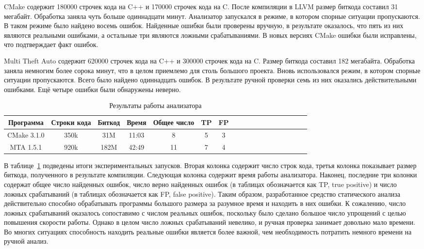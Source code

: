 CMake содержит 180000 строчек кода на C++ и 170000 строчек кода на
C. После компиляции в LLVM размер биткода составил 31
мегабайт. Обработка заняла чуть больше одиннадцати минут. Анализатор
запускался в режиме, в котором спорные ситуации пропускаются. В таком
режиме было найдено восемь ошибок. Найденные ошибки были проверены
вручную, в результате оказалось, что пять из них являются реальными
ошибками, а остальные три являются ложными срабатываниями. В новых
версиях CMake ошибки были исправлены, что подтверждает факт ошибок.

Multi Theft Auto содержит 620000 строчек кода на C++ и 300000 строчек
кода на C. Размер биткода составил 182 мегабайта. Обработка заняла
немногим более сорока минут, что в целом приемлемо для столь большого
проекта. Вновь использовался режим, в котором спорные ситуации
пропускаются. Всего было найдено одиннадцать ошибок. В результате
ручной проверки семь из них оказались действительными ошибками. Ещё
четыре ошибки были обнаружены неверно.

\begin{table}[!h]
\caption{Результаты работы анализатора}\label{tab:analyzer-results}
\centering
  \begin{tabular}{|*{18}{c|}}\hline
  Программа   & Строки кода & Биткод & Время & Общее число & TP & FP \\\hline
  CMake 3.1.0 & 350k        & 31M    & 11:03 & 8           & 5  & 3  \\\hline
  MTA 1.5.1   & 920k        & 182M   & 42:49 & 11          & 7  & 4  \\\hline
  \end{tabular}
\end{table}

В таблице~\ref{tab:analyzer-results} подведены итоги экспериментальных
запусков. Вторая колонка содержит число строк кода, третья колонка
показывает размер биткода, полученного в результате
компиляции. Следующая колонка содержит время работы
анализатора. Наконец, последние три колонки содержат общее число
найденных ошибок, число верно найденных ошибок (в таблицах
обозначается как TP, true positive) и число ложных срабатываний (в
таблицах обозначается как FP, false positive). Таким образом,
разработанное средство статического анализа действительно способно
обрабатывать программы большого размера за разумное время и находить в
них ошибки. К сожалению, число ложных срабатываний оказалось
сопоставимо с числом реальных ошибок, поскольку было сделано большое
число упрощений с целью повышения скорости работы. Однако в целом
число ложных срабатываний невелико, и ручная проверка занимает
довольно мало времени. Во многих ситуациях способность находить
реальные ошибки является более важной, чем необходимость потратить
немного времени на ручной анализ.

